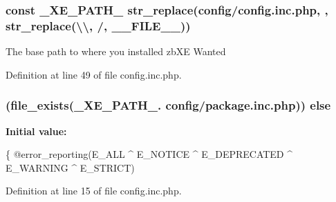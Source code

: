 \hypertarget{config_8inc_8php_a5387c7a3f2aa38adf16f324cee88db88}{}
\subsubsection[{\+\_\+\+X\+E\+\_\+\+P\+A\+T\+H\+\_\+}]{\setlength{\rightskip}{0pt plus 5cm}const \+\_\+\+X\+E\+\_\+\+P\+A\+T\+H\+\_\+ str\+\_\+replace(\textquotesingle{}config/config.\+inc.\+php\textquotesingle{}, \textquotesingle{}\textquotesingle{}, str\+\_\+replace(\textquotesingle{}\textbackslash{}\textbackslash{}\textquotesingle{}, \textquotesingle{}/\textquotesingle{}, \+\_\+\+\_\+\+F\+I\+L\+E\+\_\+\+\_\+))}\label{config_8inc_8php_a5387c7a3f2aa38adf16f324cee88db88}
The base path to where you installed zb\+X\+E Wanted 

Definition at line 49 of file config.\+inc.\+php.

\hypertarget{config_8inc_8php_a249caa62ba3f93fa3cb8d963d5634fe1}{}
\subsubsection[{else}]{ (file\+\_\+exists(\+\_\+\+X\+E\+\_\+\+P\+A\+T\+H\+\_\+. \textquotesingle{}config/package.\+inc.\+php\textquotesingle{})) else}\label{config_8inc_8php_a249caa62ba3f93fa3cb8d963d5634fe1}
{\bfseries Initial value\+:}
\begin{DoxyCode}
\{
    @error\_reporting(E\_ALL ^ E\_NOTICE ^ E\_DEPRECATED ^ E\_WARNING ^ E\_STRICT)
\end{DoxyCode}


Definition at line 15 of file config.\+inc.\+php.

\hypertarget{config_8inc_8php_ac202e21c80d0f28d495d074d3c23e1ca}{}
